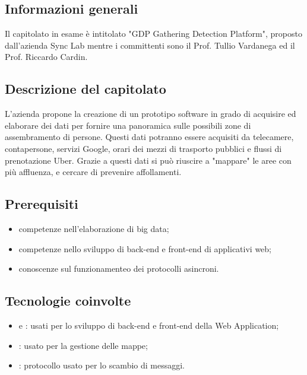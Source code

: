\subsection{Informazioni generali}
Il capitolato in esame è intitolato "GDP Gathering Detection Platform", proposto dall'azienda Sync Lab mentre i committenti sono il Prof. Tullio Vardanega ed il Prof. Riccardo Cardin.
\subsection{Descrizione del capitolato}
L'azienda propone la creazione di un prototipo software in grado di acquisire ed elaborare dei dati per fornire una panoramica sulle possibili zone di assembramento di persone.
Questi dati potranno essere acquisiti da telecamere, contapersone, servizi Google, orari dei mezzi di trasporto pubblici e flussi di prenotazione Uber.
Grazie a questi dati si può riuscire a "mappare" le aree con più affluenza, e cercare di prevenire affollamenti.
\subsection{Prerequisiti}
\begin{itemize}
    \item competenze nell'elaborazione di big data;
    \item competenze nello sviluppo di back-end e front-end di applicativi web;
    \item conoscenze sul funzionamenteo dei protocolli asincroni.
\end{itemize}
\subsection{Tecnologie coinvolte}
\begin{itemize}
    \item {} e : usati per lo sviluppo di back-end e front-end della Web Application;
    \item {}: usato per la gestione delle mappe;
    \item {}: protocollo usato per lo scambio di messaggi.

\end{itemize}
